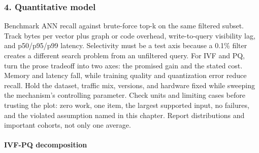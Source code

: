 \subsubsection*{4. Quantitative model}
Benchmark ANN recall against brute-force top-k on the same filtered subset. Track bytes per vector plus graph or code overhead, write-to-query visibility lag, and p50/p95/p99 latency. Selectivity must be a test axis because a 0.1\% filter creates a different search problem from an unfiltered query.
For IVF and PQ, turn the prose tradeoff into two axes: the promised gain and the stated cost. Memory and latency fall, while training quality and quantization error reduce recall. Hold the dataset, traffic mix, versions, and hardware fixed while sweeping the mechanism's controlling parameter.
Check units and limiting cases before trusting the plot: zero work, one item, the largest supported input, no failures, and the violated assumption named in this chapter. Report distributions and important cohorts, not only one average.
\paragraph{IVF-PQ decomposition}
